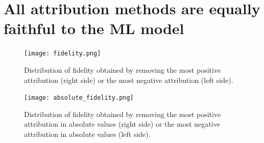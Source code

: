 \section{All attribution methods are equally faithful to the ML model}

\begin{figure}[h]
    \centering
    \texttt{[image: fidelity.png]}
    \caption{Distribution of fidelity obtained by removing the most positive 
        attribution (right side) or the most negative attribution (left side).
    }
    \label{fig:fidelity}
\end{figure}


\begin{figure}[h]
    \centering
    \texttt{[image: absolute\_fidelity.png]}
    \caption{Distribution of fidelity obtained by removing the most positive 
        attribution in absolute values (right side) or the most negative 
        attribution in absolute values (left side).
    }
    \label{fig:fidelity}
\end{figure}
